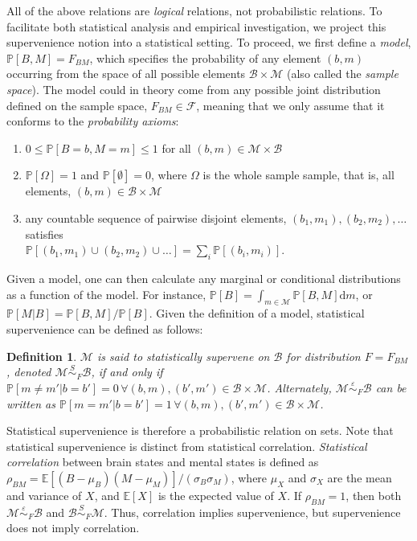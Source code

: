 \documentclass{article}
\newcommand{\mB}{\mathcal{B}}
\newcommand{\mM}{\mathcal{M}}
\newcommand{\PP}{\mathbb{P}}           %
\newcommand{\EE}{\mathbb{E}}           %
\newcommand{\sig}{\sigma}
\providecommand{\mc}[1]{\mathcal{#1}}
\newcommand{\MeB}{\mM \overset{\varepsilon}{{\sim}}_F \mB}
\newtheorem{defi}{Definition}
\begin{document}
All of the above relations are \emph{logical} relations, not probabilistic relations. To facilitate both statistical analysis and empirical investigation, we project this supervenience notion into a statistical setting.  To proceed, we first define a \emph{model}, $\PP[B,M]=F_{BM}$, which specifies the probability of any element $(b,m)$ occurring from the space of all possible elements $\mB \times \mM$ (also called the \emph{sample space}).  The model could in theory come from any possible joint distribution defined on the sample space, $F_{BM} \in \mc{F}$, meaning that we only assume that it conforms to the \emph{probability axioms}:
\begin{enumerate}
	\item $0 \leq \PP[B=b,M=m] \leq 1$ for all $(b,m) \in \mM \times \mB$
	\item $\PP[\Omega]=1$ and $\PP[\emptyset]=0$, where $\Omega$ is the whole sample sample, that is, all elements, $(b,m) \in \mB \times \mM$
	\item any countable sequence of pairwise disjoint elements, $(b_1,m_1), (b_2,m_2), \ldots$ satisfies \\
	\mbox{$\PP[(b_1,m_1) \cup (b_2,m_2) \cup \ldots] = \sum_i \PP[(b_i,m_i)]$}.
\end{enumerate}
Given a model, one can then calculate any marginal or conditional distributions as a function of the model.  For instance, $\PP[B]=\int_{m \in \mM} \PP[B,M]\text{d}m$, or $\PP[M|B]=\PP[B,M]/\PP[B]$.  Given the definition of a model, statistical supervenience can be defined as follows:
\begin{defi}
\label{def1} 
$\mM$ is said to \textit{statistically supervene} on $\mB$ for distribution $F=F_{BM}$, denoted $\mM \overset{S}{\sim}_F \mB$, if and only if $\PP[m \neq m' | b=b']=0 \, \forall (b,m), (b',m') \in \mB \times \mM$. Alternately, $\MeB$ can be written as $\PP[m = m' | b = b']=1  \, \forall (b,m), (b',m') \in \mB \times \mM$.
\end{defi}
Statistical supervenience is therefore a probabilistic relation on sets.  Note that statistical supervenience is distinct from statistical correlation.  \emph{Statistical correlation} between brain states and mental states is defined as $\rho_{BM}=\EE[(B-\mu_B)(M-\mu_M)]/(\sig_B \sig_M)$, where $\mu_X$ and $\sig_X$ are the mean and variance of $X$, and $\EE[X]$ is the expected value of $X$.  If $\rho_{BM}=1$, then both $\MeB$ and $\mB \overset{S}{\sim}_F \mM$. Thus, correlation implies supervenience, but supervenience does not imply correlation.  
\end{document}
